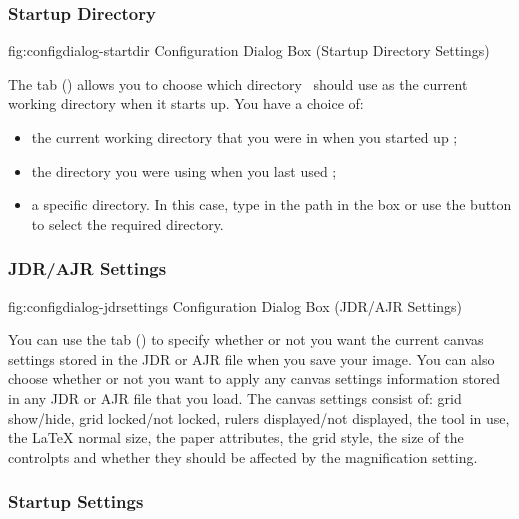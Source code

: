 \subsubsection{Startup Directory}\label{sec:startdir}


\FloatFig
  {fig:configdialog-startdir}
  {}
  {Configuration Dialog Box (Startup Directory Settings)}

The  tab
()
allows you to choose which directory \FlowframTk\ should use as the
current working directory when it starts up. You have a choice of:
\begin{itemize}
\item the current working directory that you were in when you started
up \FlowframTk;
\item the directory you were using when you last used \FlowframTk;
\item a specific directory. In this case, type in the path in the
 box or use the
 button to select the required
directory.
\end{itemize}


\subsubsection{JDR/AJR Settings}\label{sec:jdrsettings}


\FloatFig
  {fig:configdialog-jdrsettings}
  {}
  {Configuration Dialog Box (JDR/AJR Settings)}

You can use the  tab
()
to specify whether or not you want the current
\gls{canvas} settings stored in the \gls{JDR} or \gls{AJR} file when
you save your image. You can also choose whether or not you want to
apply any canvas settings information stored in any \gls{JDR} or
\gls{AJR} file that you load. The canvas settings consist of:
grid show\slash hide, grid locked\slash not locked, rulers
displayed\slash not displayed, the tool in use, the LaTeX normal
size, the \gls{paper} attributes, the grid style, the size of the
\glspl{controlpt} and whether they should be affected by the
magnification setting.


\subsubsection{Startup Settings}\label{sec:initsettings}

